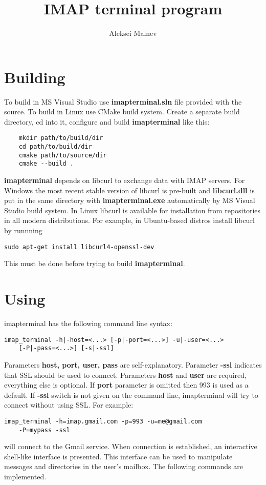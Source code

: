 \documentclass[titlepage]{article}
\title{IMAP terminal program}
\author{Aleksei Malnev}
\begin{document}
\section{Building}
To build in MS Visual Studio use \textbf{imap\textunderscore terminal.sln} file provided with the source. 
To build in Linux use CMake build system. Create a separate build directory, cd into it,
configure and build \textbf{imap\textunderscore terminal} like this:
\begin{lstlisting}
	mkdir path/to/build/dir
	cd path/to/build/dir
	cmake path/to/source/dir
	cmake --build .
\end{lstlisting}
\textbf{imap\textunderscore terminal} depends on libcurl to exchange data with IMAP servers.
For Windows the most recent stable version of libcurl is pre-built and \textbf{libcurl.dll} is 
put in the same directory with \textbf{imap\textunderscore terminal.exe} automatically by 
MS Visual Studio build system. In Linux
libcurl is available for installation from repositories in all modern distributions. For example,
in Ubuntu-based distros install libcurl by runnning
\begin{lstlisting}
sudo apt-get install libcurl4-openssl-dev
\end{lstlisting}
This must be done before trying to build \textbf{imap\textunderscore terminal}.

\section{Using}
imap\textunderscore terminal has the following command line syntax:
\begin{lstlisting}
imap_terminal -h|-host=<...> [-p|-port=<...>] -u|-user=<...> 
	[-P|-pass=<...>] [-s|-ssl]
\end{lstlisting}
Parameters \textbf{host, port, user, pass} are self-explanatory. Parameter \textbf{-ssl}  indicates
that SSL should be used to connect. Parameters \textbf{host} and \textbf{user} are required, 
everything else is optional. If \textbf{port} parameter is omitted then 993 is used as a default. If
\textbf{-ssl} switch is not given on the command line, imap\textunderscore terminal will try to connect
without using SSL. For example:
\begin{lstlisting}
imap_terminal -h=imap.gmail.com -p=993 -u=me@gmail.com 
	-P=mypass -ssl
\end{lstlisting}
will connect to the Gmail service. When connection is established, an interactive shell-like interface
is presented. This interface can be used to manipulate messages and directories in the user's mailbox.
The following commands are implemented.
\end{document}
